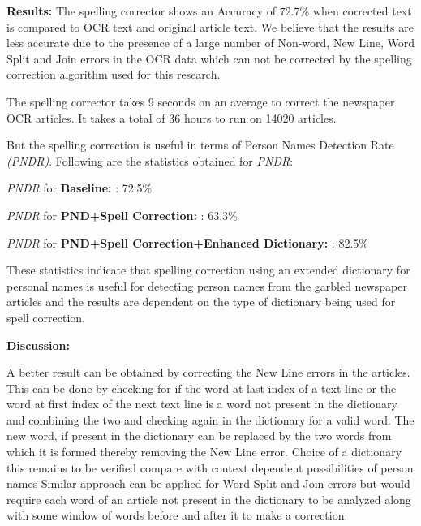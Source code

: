 \documentclass[letterpaper,11pt]{report}
\begin{document}
\noindent \textbf{Results: }
The spelling corrector shows an Accuracy of $72.7 \%$  when corrected text is compared to OCR text and original article text. We believe that the results are less accurate due to the presence of a large number of Non-word, New Line, Word Split and Join errors in the OCR data which can not be corrected by the spelling correction algorithm used for this research.

The spelling corrector takes 9 seconds on an average to correct the newspaper OCR articles. It takes a total of 36 hours to run on 14020 articles.

 
But the spelling correction is useful in terms of Person Names Detection Rate \textit{(PNDR)}. Following are the statistics obtained for \textit{PNDR}:

\textit{PNDR} for \textbf{Baseline: }: 72.5\% 

\textit{PNDR} for \textbf{PND+Spell Correction: }: 63.3\% 

\textit{PNDR} for \textbf{PND+Spell Correction+Enhanced Dictionary: }: 82.5\% 

These statistics indicate that spelling correction using an extended dictionary for personal names is useful for detecting person names from the garbled newspaper articles and the results are dependent on the type of dictionary being used for spell correction.
 
\textbf{Discussion: }


A better result can be obtained by correcting the New Line errors in the articles. This can be done by checking for if the word at last index of a text line or the word at first index of the next text line is a word not present in the dictionary and combining the two and checking again in the dictionary for a valid word. The new word, if present in the dictionary can be replaced by the two words from which it is formed thereby removing the New Line error. 
Choice of a dictionary this remains to be verified
compare with context dependent
possibilities of person names
Similar approach can be applied for Word Split and Join errors but would require each word of an article not present in the dictionary to be analyzed along with some window of words before and after it to make a correction. 
\end{document}

